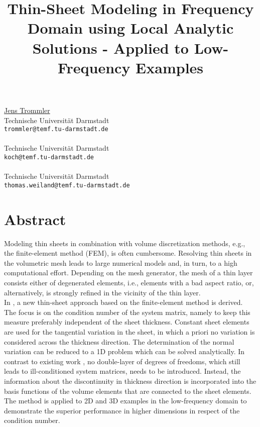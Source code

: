 \title{Thin-Sheet Modeling in Frequency Domain using Local Analytic Solutions - Applied to Low-Frequency Examples}
 \author{} \institute{}
\maketitle
\begin{center}
{\large \underline{Jens Trommler}}\\
Technische Universit\"at Darmstadt\\
{\tt trommler@temf.tu-darmstadt.de}
\\ \vspace{4mm}{\large Stephan Koch}\\
Technische Universit\"at Darmstadt\\
{\tt koch@temf.tu-darmstadt.de}
\\ \vspace{4mm}{\large Thomas Weiland}\\
Technische Universit\"at Darmstadt\\
{\tt thomas.weiland@temf.tu-darmstadt.de}

\end{center}

\section*{Abstract}

Modeling thin sheets in combination with volume discretization methods,
e.g., the finite-element method (FEM), is often cumbersome. Resolving thin
sheets in the volumetric mesh leads to large numerical models and, in turn,
to a high computational effort. Depending on the mesh generator,
the mesh of a thin layer consists either of degenerated elements, i.e.,
elements with a bad aspect ratio, or, alternatively, is strongly refined
in the vicinity of the thin layer.\\
In \cite{Trommler2011}, a new thin-sheet approach based on the finite-element method is derived.
The focus is on the condition number of the system matrix, namely
to keep this measure preferably independent of the sheet thickness.
Constant sheet elements \cite{Nakata1990} are used for the tangential variation in the sheet,
in which a priori no variation is considered across the thickness direction.
The determination of the normal variation can be reduced
to a 1D problem which can be solved analytically.
In contrast to existing work \cite{Gyse2008}\cite{Krahen1993}, no double-layer of degrees of freedoms, which still leads to ill-conditioned system matrices, needs to be introduced.
Instead, the information about the discontinuity in thickness direction is incorporated into the basis functions of the volume elements that are connected to the sheet elements.\\The method is applied to 2D and 3D examples in the low-frequency domain to demonstrate the superior performance in higher dimensions in respect of the condition number.

